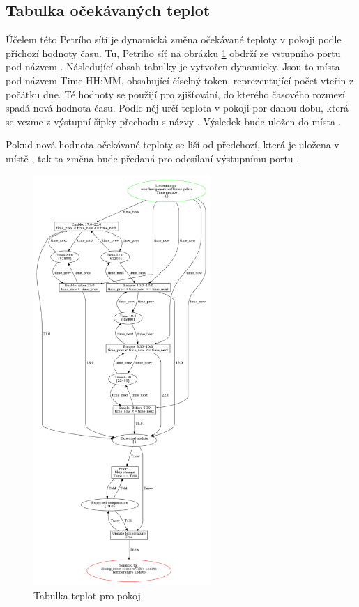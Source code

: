 \subsection{Tabulka očekávaných teplot}
\label{subsec:room-table}

Účelem této Petrího sítí je dynamická změna očekávané teploty v pokoji podle příchozí hodnoty času. Tu, Petriho síť na obrázku \ref{room-table-viz} obdrží ze vstupního portu pod názvem . Následující obsah tabulky je vytvořen dynamicky. Jsou to místa pod názvem Time-HH:MM, obsahující číselný token, reprezentující  počet vteřin z počátku dne. Té hodnoty se použijí pro zjišťování, do kterého časového rozmezí spadá nová hodnota času. Podle něj určí teplota v pokoji por danou dobu, která se vezme z výstupní šipky přechodu s názvy . Výsledek bude uložen do místa .

Pokud nová hodnota očekávané teploty se liší od předchozí, která je uložena v místě , tak ta změna bude předaná pro odesílaní výstupnímu portu .

\begin{figure}[htb]
 \centering
 \includegraphics[width=0.6\textwidth]{obrazky-figures/room-timetable.png}
 \caption{Tabulka teplot pro pokoj.}
 \label{room-table-viz}
\end{figure}

